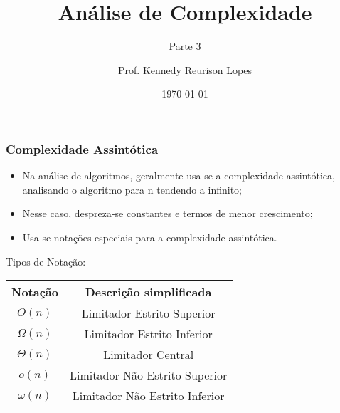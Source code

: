 \documentclass[10pt]{beamer}
\title{Análise de Complexidade}
\author{Prof. Kennedy Reurison Lopes}
\subtitle{Parte 3}
\date{\today}
\begin{document}
\frame{\titlepage}%
\begin{frame}[t]
    \frametitle{Complexidade Assintótica}
    \begin{itemize}
        \item Na análise de algoritmos, geralmente usa-se a complexidade assintótica, analisando o algoritmo para n tendendo a infinito;
        \item Nesse caso, despreza-se constantes e termos de menor crescimento;
        \item Usa-se notações especiais para a complexidade assintótica.
    \end{itemize}
    \pause Tipos de Notação:
    \pause\begin{center}

        \begin{tabular}{c|c}
            \textbf{Notação}   & \textbf{Descrição simplificada} \\
            \hline
            \pause $O(n)$      & Limitador Estrito Superior      \\
            \pause $\Omega(n)$ & Limitador Estrito Inferior      \\
            \pause $\Theta(n)$ & Limitador Central               \\
            \pause $o(n)$      & Limitador Não Estrito Superior  \\
            \pause $\omega(n)$ & Limitador Não Estrito Inferior  \\
            \hline
        \end{tabular}
    \end{center}
\end{frame}
\end{document}
